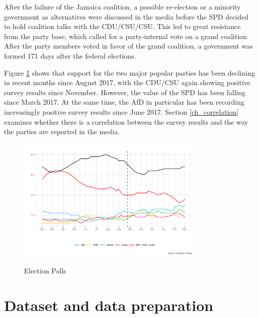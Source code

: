 \documentclass[12pt,a4paper,notitlepage]{article}
\begin{document}
After the failure of the Jamaica coalition, a possible re-election or a minority government as alternatives were discussed in the media before the SPD decided to hold coalition talks with the CDU/CSU/CSU. This led to great resistance from the party base, which called for a party-internal vote on a grand coalition. After the party members voted in favor of the grand coalition, a government was formed 171 days after the federal elections. 

Figure \ref{fig_polls} shows that support for the two major popular parties has been declining in recent months since August 2017, with the CDU/CSU again showing positive survey results since November. However, the value of the SPD has been falling since March 2017. At the same time, the AfD in particular has been recording increasingly positive survey results since June 2017. Section \ref{ch_correlation} examines whether there is a correlation between the survey results and the way the parties are reported in the media. 

\begin{figure}[H]
\begin{center}
	\caption{Election Polls}
	\includegraphics[width=0.8\textwidth]{../figs/polls.png}
	\label{fig_polls}
	\end{center}
\end{figure}

\section{Dataset and data preparation}\label{ch_data}
\end{document}
